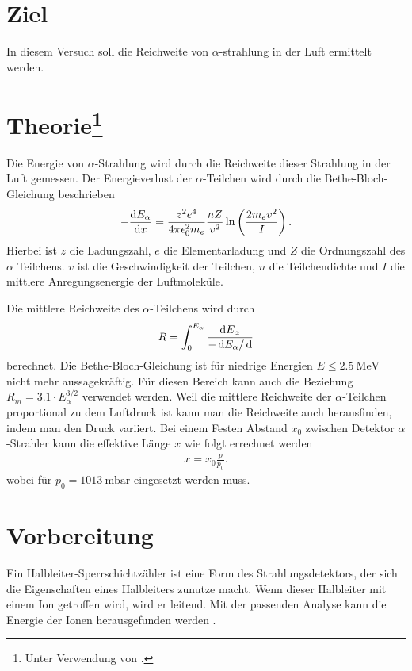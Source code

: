 \section{Ziel}
In diesem Versuch soll die Reichweite von $\alpha$-strahlung in der Luft ermittelt werden.

\section[Theorie]{Theorie\footnote[1]{Unter Verwendung von \cite{man:v701}.}}
Die Energie von $\alpha$-Strahlung wird durch die Reichweite dieser Strahlung in der Luft gemessen.
Der Energieverlust der $\alpha$-Teilchen wird durch die Bethe-Bloch-Gleichung beschrieben
\begin{align}
    -\frac{\mathop{}\!\mathrm{d} E_\alpha}{\mathop{}\!\mathrm{d} x} = \frac{z^2 e^4}{4 \pi \epsilon_0^2 m_e} \frac{n Z}{v^2} \ln\left(\frac{2 m_e v^2}{I}\right).
\end{align}
Hierbei ist $z$ die Ladungszahl, $e$ die Elementarladung und $Z$ die Ordnungszahl des $\alpha$ Teilchens.
$v$ ist die Geschwindigkeit der Teilchen, $n$ die Teilchendichte und $I$ die mittlere Anregungsenergie der Luftmoleküle.

Die mittlere Reichweite des $\alpha$-Teilchens wird durch 
\begin{align}
    R = \int_0^{E_\alpha} \frac{\mathop{}\!\mathrm{d} E_\alpha}{-\mathop{}\!\mathrm{d} E_\alpha / \mathop{}\!\mathrm{d}}
    \label{eq:reichweite}
\end{align}
berechnet.
Die Bethe-Bloch-Gleichung ist für niedrige Energien $E \leq \qty{2.5}{\mega\electronvolt}$ nicht mehr aussagekräftig.
Für diesen Bereich kann auch die Beziehung $R_m = 3.1 \cdot E_\alpha^{3/2}$ verwendet werden.
Weil die mittlere Reichweite der $\alpha$-Teilchen proportional zu dem Luftdruck ist kann man die Reichweite auch herausfinden,
indem man den Druck variiert.
Bei einem Festen Abstand $x_0$ zwischen Detektor $\alpha$-Strahler kann die effektive Länge $x$ wie folgt errechnet werden
\begin{align}
    x = x_0 \frac{p}{p_0}.
\end{align}
wobei für $p_0 = \qty{1013}{\milli\bar}$ eingesetzt werden muss.



\section{Vorbereitung}
Ein Halbleiter-Sperrschichtzähler ist eine Form des Strahlungsdetektors, der sich die Eigenschaften eines Halbleiters zunutze macht.
Wenn dieser Halbleiter mit einem Ion getroffen wird, wird er leitend. 
Mit der passenden Analyse kann die Energie der Ionen herausgefunden werden \cite[vgl.]{man:v701}.
